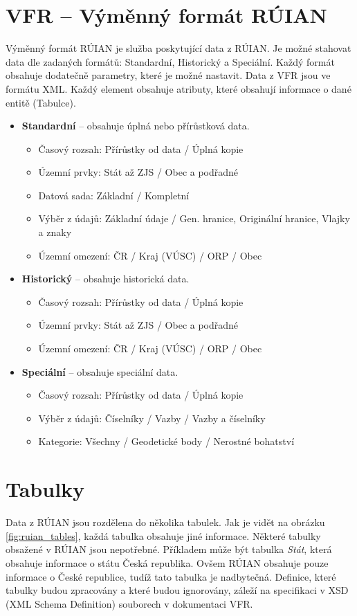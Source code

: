 \documentclass[czech, kiv, ba, he, iso690alph, pdf]{fasthesis}
\begin{document}
\section{VFR -- Výměnný formát RÚIAN}
Výměnný formát RÚIAN je služba poskytující data z RÚIAN.
Je možné stahovat data dle zadaných formátů: Standardní, Historický a Speciální.
Každý formát obsahuje dodatečně parametry, které je možné nastavit.
Data z VFR jsou ve formátu XML.
Každý element obsahuje atributy, které obsahují informace o dané entitě (Tabulce).
\pagebreak
\begin {itemize}
    \item \textbf{Standardní} -- obsahuje úplná nebo přírůstková data.
    \begin {itemize}
        \item Časový rozsah: Přírůstky od data / Úplná kopie
        \item Územní prvky: Stát až ZJS / Obec a podřadné
        \item Datová sada: Základní / Kompletní
        \item Výběr z údajů: Základní údaje / Gen. hranice, Originální hranice, Vlajky a znaky
        \item Územní omezení: ČR / Kraj (VÚSC) / ORP / Obec
    \end {itemize}
    \item \textbf{Historický} -- obsahuje historická data.
    \begin {itemize}
        \item Časový rozsah: Přírůstky od data / Úplná kopie
        \item Územní prvky: Stát až ZJS / Obec a podřadné
        \item Územní omezení: ČR / Kraj (VÚSC) / ORP / Obec
    \end {itemize}
    \item \textbf{Speciální} -- obsahuje speciální data.
    \begin {itemize}
        \item Časový rozsah: Přírůstky od data / Úplná kopie
        \item Výběr z údajů: Číselníky / Vazby / Vazby a číselníky
        \item Kategorie: Všechny / Geodetické body / Nerostné bohatství
    \end {itemize}
\end {itemize}

\section{Tabulky}
Data z RÚIAN jsou rozdělena do několika tabulek.
Jak je vidět na obrázku \ref{fig:ruian_tables}, každá tabulka obsahuje jiné informace.
Některé tabulky obsažené v RÚIAN jsou nepotřebné. 
Příkladem může být tabulka \textit{Stát}, která obsahuje informace o státu Česká republika.
Ovšem RÚIAN obsahuje pouze informace o České republice, tudíž tato tabulka je nadbytečná.
Definice, které tabulky budou zpracovány a které budou ignorovány, záleží na specifikaci v XSD (XML Schema Definition) souborech v dokumentaci VFR. 
\end{document}
